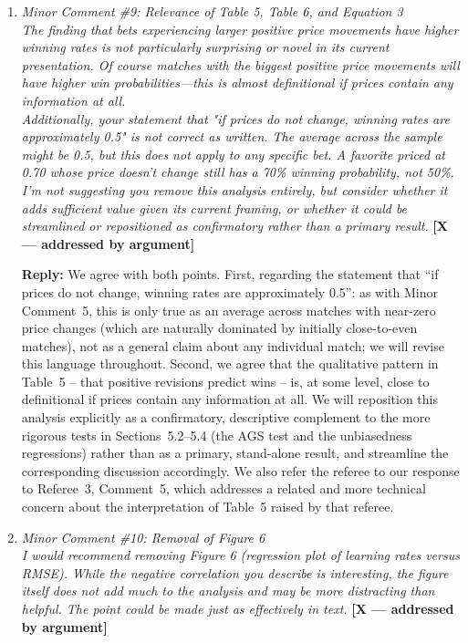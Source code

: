 \documentclass[letterpaper,12pt]{article}
\newcounter{b}
\newcommand{\argX}{\textcolor{green!55!black}{\textbf{[X --- addressed by argument]}}}
\newcommand{\Reply}[1]{\par\noindent\textbf{Reply:} #1}
\begin{document}
\begin{enumerate}
\item \textit{Minor Comment \#9: Relevance of Table 5, Table 6, and Equation 3\\[6pt]
The finding that bets experiencing larger positive price movements have higher winning rates is not particularly surprising or novel in its current presentation. Of course matches with the biggest positive price movements will have higher win probabilities—this is almost definitional if prices contain any information at all.\\[6pt]
Additionally, your statement that "if prices do not change, winning rates are approximately 0.5" is not correct as written. The average across the sample might be 0.5, but this does not apply to any specific bet. A favorite priced at 0.70 whose price doesn't change still has a 70\% winning probability, not 50\%.\\[6pt]
I'm not suggesting you remove this analysis entirely, but consider whether it adds sufficient value given its current framing, or whether it could be streamlined or repositioned as confirmatory rather than a primary result.} \argX

\Reply{We agree with both points. First, regarding the statement that ``if prices do not change, winning rates are approximately 0.5'': as with Minor Comment~5, this is only true as an average across matches with near-zero price changes (which are naturally dominated by initially close-to-even matches), not as a general claim about any individual match; we will revise this language throughout. Second, we agree that the qualitative pattern in Table~5 -- that positive revisions predict wins -- is, at some level, close to definitional if prices contain any information at all. We will reposition this analysis explicitly as a confirmatory, descriptive complement to the more rigorous tests in Sections~5.2--5.4 (the AGS test and the unbiasedness regressions) rather than as a primary, stand-alone result, and streamline the corresponding discussion accordingly. We also refer the referee to our response to Referee~3, Comment~5, which addresses a related and more technical concern about the interpretation of Table~5 raised by that referee.}

\item \textit{Minor Comment \#10: Removal of Figure 6\\[6pt]
I would recommend removing Figure 6 (regression plot of learning rates versus RMSE). While the negative correlation you describe is interesting, the figure itself does not add much to the analysis and may be more distracting than helpful. The point could be made just as effectively in text.} \argX


\end{enumerate}
\end{document}
